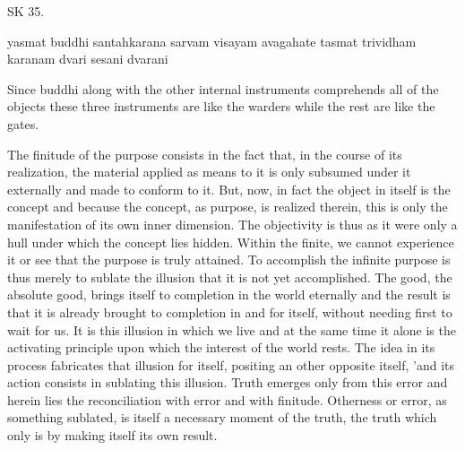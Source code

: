 SK 35.

yasmat buddhi santahkarana sarvam visayam avagahate
tasmat trividham karanam dvari sesani dvarani

Since buddhi along with the other internal instruments
comprehends all of the objects these three instruments are
like the warders while the rest are like the gates.

The finitude of the purpose consists in the fact that, in the course
of its realization, the material applied as means to it is only subsumed under it
externally and made to conform to it. But, now, in fact the object in itself is the
concept and because the concept, as purpose, is realized therein, this is only the
manifestation of its own inner dimension. The objectivity is thus as it were only a
hull under which the concept lies hidden. Within the finite, we cannot experience
it or see that the purpose is truly attained. To accomplish the infinite purpose is
thus merely to sublate the illusion that it is not yet accomplished. The
good, the absolute good, brings itself to completion in the world eternally and the
result is that it is already brought to completion in and for itself, without needing
first to wait for us. It is this illusion in which we live and at the same time it alone
is the activating principle upon which the interest of the world rests. The idea in
its process fabricates that illusion for itself, positing an other opposite itself, 'and
its action consists in sublating this illusion. Truth emerges only from this error
and herein lies the reconciliation with error and with finitude. Otherness or error,
as something sublated, is itself a necessary moment of the truth, the truth which
only is by making itself its own result.

